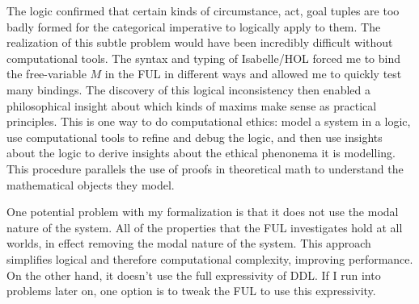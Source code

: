 \begin{isabellebody}
\begin{isamarkuptext}
The logic confirmed that certain kinds
of circumstance, act, goal tuples are too badly formed for the categorical imperative to logically 
apply to them. The realization of this subtle problem would have been incredibly difficult without 
computational tools. The syntax and typing of Isabelle/HOL forced me to bind the free-variable $M$
in the FUL in different ways and allowed me to quickly test many bindings. The discovery of this 
logical inconsistency then enabled a philosophical insight about which kinds of maxims make sense as 
practical principles. This is one way to do computational ethics: model a system in a logic, use 
computational tools to refine and debug the logic, and then use insights about the logic to derive 
insights about the ethical phenonema it is modelling. This procedure parallels the use of proofs in 
theoretical math to understand the mathematical objects they model.%
\end{isamarkuptext}\isamarkuptrue%
%
\begin{isamarkuptext}%
One potential problem with my formalization is that it does not use the modal nature of the system. 
All of the properties that the FUL investigates hold at all worlds, in effect removing the modal nature 
of the system. This approach simplifies logical and therefore computational complexity, improving 
performance. On the other hand, it doesn't use the full expressivity of DDL. If I run into problems 
later on, one option is to tweak the FUL to use this expressivity.%
\end{isamarkuptext}\isamarkuptrue%
%
\isadelimproof
%
\endisadelimproof
%
\isatagproof
%
\endisatagproof
{\isafoldproof}%
%
\isadelimproof
%
\endisadelimproof
%
\isadelimtheory
%
\endisadelimtheory
%
\isatagtheory
%
\endisatagtheory
{\isafoldtheory}%
%
\isadelimtheory
%
\endisadelimtheory
%
\end{isabellebody}%
\endinput
